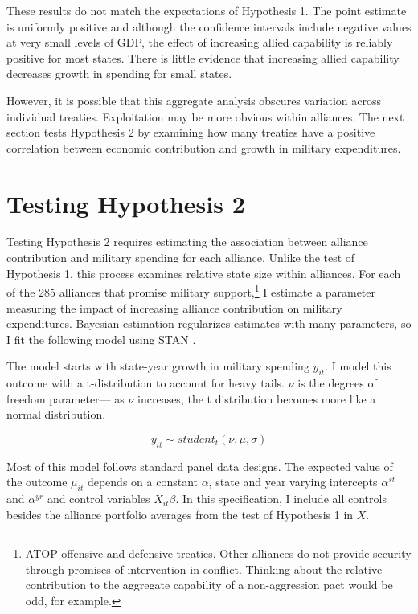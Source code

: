 \documentclass[12pt]{article}
\begin{document}
These results do not match the expectations of Hypothesis 1. 
The point estimate is uniformly positive and although the confidence intervals include negative values at very small levels of GDP, the effect of increasing allied capability is reliably positive for most states. 
There is little evidence that increasing allied capability decreases growth in spending for small states. 


However, it is possible that this aggregate analysis obscures variation across individual treaties. 
Exploitation may be more obvious within alliances. 
The next section tests Hypothesis 2 by examining how many treaties have a positive correlation between economic contribution and growth in military expenditures. 


\section{Testing Hypothesis 2}


Testing Hypothesis 2 requires estimating the association between alliance contribution and military spending for each alliance.
Unlike the test of Hypothesis 1, this process examines relative state size within alliances. 
For each of the 285 alliances that promise military support,\footnote{ATOP offensive and defensive treaties. Other alliances do not provide security through promises of intervention in conflict. Thinking about the relative contribution to the aggregate capability of a non-aggression pact would be odd, for example.} 
I estimate a parameter measuring the impact of increasing alliance contribution on military expenditures. 
Bayesian estimation regularizes estimates with many parameters, so I fit the following model using STAN \citep{Carpenteretal2016}.


The model starts with state-year growth in military spending $y_{it}$.
I model this outcome with a t-distribution to account for heavy tails.
$\nu$ is the degrees of freedom parameter--- as $\nu$ increases, the t distribution becomes more like a normal distribution. 


\begin{equation}
y_{it} \sim student_t(\nu, \mu, \sigma) 
\end{equation}


Most of this model follows standard panel data designs.
The expected value of the outcome $\mu_{it}$ depends on a constant $\alpha$, state and year varying intercepts $\alpha^{st}$ and $\alpha^{yr}$ and control variables $X_{it} \beta$. 
In this specification, I include all controls besides the alliance portfolio averages from the test of Hypothesis 1 in $X$.
\end{document}

